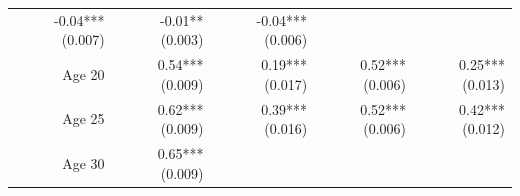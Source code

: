 \documentclass[]{article}
\begin{document}
\begin{longtable}[c]{@{}rrrrr@{}}
\begin{minipage}[t]{0.16\columnwidth}
-0.04*** (0.007)
\strut\end{minipage} &
\begin{minipage}[t]{0.18\columnwidth}\raggedleft\strut
-0.01** (0.003)
\strut\end{minipage} &
\begin{minipage}[t]{0.15\columnwidth}\raggedleft\strut
-0.04*** (0.006)
\strut\end{minipage}\tabularnewline
\begin{minipage}[t]{0.17\columnwidth}\raggedleft\strut
Age 20
\strut\end{minipage} &
\begin{minipage}[t]{0.20\columnwidth}\raggedleft\strut
0.54*** (0.009)
\strut\end{minipage} &
\begin{minipage}[t]{0.16\columnwidth}\raggedleft\strut
0.19*** (0.017)
\strut\end{minipage} &
\begin{minipage}[t]{0.18\columnwidth}\raggedleft\strut
0.52*** (0.006)
\strut\end{minipage} &
\begin{minipage}[t]{0.15\columnwidth}\raggedleft\strut
0.25*** (0.013)
\strut\end{minipage}\tabularnewline
\begin{minipage}[t]{0.17\columnwidth}\raggedleft\strut
Age 25
\strut\end{minipage} &
\begin{minipage}[t]{0.20\columnwidth}\raggedleft\strut
0.62*** (0.009)
\strut\end{minipage} &
\begin{minipage}[t]{0.16\columnwidth}\raggedleft\strut
0.39*** (0.016)
\strut\end{minipage} &
\begin{minipage}[t]{0.18\columnwidth}\raggedleft\strut
0.52*** (0.006)
\strut\end{minipage} &
\begin{minipage}[t]{0.15\columnwidth}\raggedleft\strut
0.42*** (0.012)
\strut\end{minipage}\tabularnewline
\begin{minipage}[t]{0.17\columnwidth}\raggedleft\strut
Age 30
\strut\end{minipage} &
\begin{minipage}[t]{0.20\columnwidth}\raggedleft\strut
0.65*** (0.009)
\strut\end{minipage} &
\begin{minipage}[t]{0.16\columnwidth}\raggedleft\strut

\end{minipage}
\end{longtable}
\end{document}
